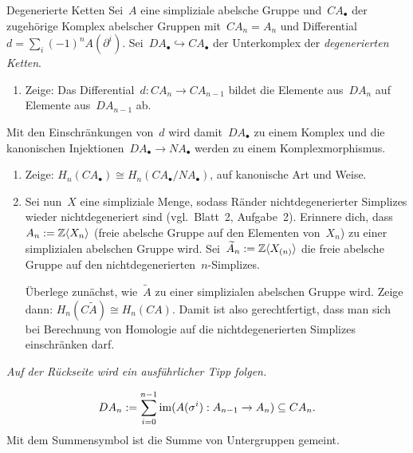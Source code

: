 \documentclass{uebblatt}
\begin{document}
\begin{aufgabe}{Degenerierte Ketten}
Sei~$A$ eine simpliziale abelsche Gruppe und~$CA_\bullet$ der zugehörige
Komplex abelscher Gruppen mit~$CA_n = A_n$ und Differential~$d = \sum_i (-1)^n
A(\partial^i)$. Sei~$DA_\bullet \hookrightarrow CA_\bullet$ der Unterkomplex
der \emph{degenerierten Ketten}.
\begin{enumerate}
\item Zeige: Das Differential~$d : CA_n \to CA_{n-1}$ bildet die Elemente
aus~$DA_n$ auf Elemente aus~$DA_{n-1}$ ab.
\end{enumerate}
Mit den Einschränkungen von~$d$ wird damit~$DA_\bullet$ zu einem Komplex und die
kanonischen Injektionen~$DA_\bullet \to NA_\bullet$ werden zu einem Komplexmorphismus.
\begin{enumerate}
\addtocounter{enumi}{1}
\item Zeige: $H_n(CA_\bullet) \cong H_n(CA_\bullet/NA_\bullet)$, auf kanonische
Art und Weise.
\item Sei nun~$X$ eine simpliziale Menge, sodass Ränder nichtdegenerierter
Simplizes wieder nichtdegeneriert sind (vgl.~Blatt~2, Aufgabe~2). Erinnere
dich, dass~$A_n := \mathbb{Z}\langle X_n \rangle$ (freie abelsche Gruppe auf den
Elementen von~$X_n$) zu einer simplizialen abelschen Gruppe wird.
Sei~$\widetilde A_n := \mathbb{Z}\langle X_{(n)} \rangle$ die freie abelsche Gruppe
auf den nichtdegenerierten~$n$-Simplizes.

Überlege zunächst, wie~$\widetilde A$ zu einer simplizialen abelschen Gruppe wird.
Zeige dann: $H_n(C\widetilde A) \cong H_n(CA)$. Damit ist also gerechtfertigt,
dass man sich bei Berechnung von Homologie auf die nichtdegenerierten Simplizes
einschränken darf.
\end{enumerate}

\emph{Auf der Rückseite wird ein ausführlicher Tipp folgen.}
\end{aufgabe}

\[ DA_n := \sum_{i=0}^{n-1} \operatorname{im}(A(\sigma^i) : A_{n-1} \to A_n) \subseteq
CA_n. \]
Mit dem Summensymbol ist die Summe von Untergruppen gemeint.
\end{document}
